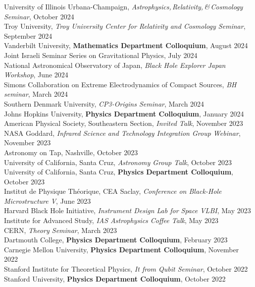 \documentclass[margin,line]{resume}
\begin{document}
\begin{resume}
University of Illinois Urbana-Champaign, \textit{Astrophysics,\,Relativity,\,\&\,Cosmology\,Seminar}, October 2024 \\
Troy University, \textit{Troy University Center for Relativity and Cosmology Seminar}, September 2024\\
Vanderbilt University, \textbf{Mathematics Department Colloquium}, August 2024 \\
Joint Israeli Seminar Series on Gravitational Physics, July 2024 \\
National Astronomical Observatory of Japan, \textit{Black Hole Explorer Japan Workshop}, June 2024\\
Simons Collaboration on Extreme Electrodynamics of Compact Sources, \textit{BH seminar}, March 2024\\
Southern Denmark University, \textit{CP3-Origins Seminar}, March 2024 \\
Johns Hopkins University, \textbf{Physics Department Colloquium}, January 2024 \\
American Physical Society, Southeastern Section,  \textit{Invited Talk}, November 2023 \\
NASA Goddard, \textit{Infrared Science and Technology Integration Group Webinar}, November 2023\\
Astronomy on Tap, Nashville, October 2023 \\
University of California, Santa Cruz, \textit{Astronomy Group Talk}, October 2023 \\
University of California, Santa Cruz, \textbf{Physics Department Colloquium}, October 2023 \\
Institut de Physique Th\'eorique, CEA Saclay, \textit{Conference on Black-Hole Microstructure V}, June 2023 \\
Harvard Black Hole Initiative, \textit{Instrument Design Lab for Space VLBI}, May 2023\\
Institute for Advanced Study, \textit{IAS Astrophysics Coffee Talk}, May 2023 \\
CERN, \textit{Theory Seminar}, March 2023 \\
Dartmouth College, \textbf{Physics Department Colloquium}, February 2023 \\
Carnegie Mellon University, \textbf{Physics Department Colloquium}, November 2022 \\
Stanford Institute for Theoretical Physics, \textit{It from Qubit Seminar}, October 2022 \\
Stanford University, \textbf{Physics Department Colloquium}, October 2022 \\

\end{resume}
\end{document}
